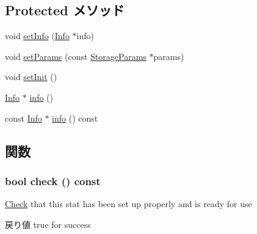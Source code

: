\subsection*{Protected メソッド}
\begin{DoxyCompactItemize}
\item 
void \hyperlink{classStats_1_1InfoAccess_aa934ced0a9371cd4be6ef11cb97aebed}{setInfo} (\hyperlink{classStats_1_1Info}{Info} $\ast$info)
\item 
void \hyperlink{classStats_1_1InfoAccess_a1cd4fa8eb589bba328e8be930bbe4ec3}{setParams} (const \hyperlink{structStats_1_1StorageParams}{StorageParams} $\ast$params)
\item 
void \hyperlink{classStats_1_1InfoAccess_a05110e334f3c79a4ebaad30aac5c4acd}{setInit} ()
\item 
\hyperlink{classStats_1_1Info}{Info} $\ast$ \hyperlink{classStats_1_1InfoAccess_af42813244273f247e199283572cb5e9c}{info} ()
\item 
const \hyperlink{classStats_1_1Info}{Info} $\ast$ \hyperlink{classStats_1_1InfoAccess_add4438b5956a40b37420bc32c40ef50a}{info} () const 
\end{DoxyCompactItemize}


\subsection{関数}
\hypertarget{classStats_1_1InfoAccess_a6ecddb2c44556b7acbc1723a968ff8bb}{
\subsubsection[{check}]{\setlength{\rightskip}{0pt plus 5cm}bool check () const}}
\label{classStats_1_1InfoAccess_a6ecddb2c44556b7acbc1723a968ff8bb}
\hyperlink{classCheck}{Check} that this stat has been set up properly and is ready for use \begin{DoxyReturn}{戻り値}
true for success 
\end{DoxyReturn}


